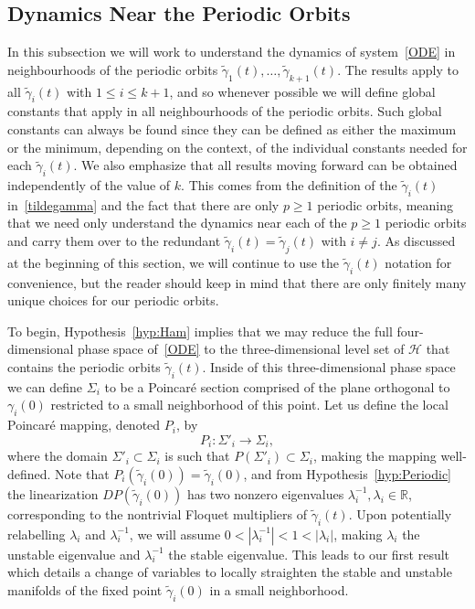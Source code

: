 \documentclass[11pt]{article}
\numberwithin{equation}{section}
\theoremstyle{plain}
\begin{document}
\subsection{Dynamics Near the Periodic Orbits}\label{subsec:Local}

In this subsection we will work to understand the dynamics of system~\eqref{ODE} in neighbourhoods of the periodic orbits $\tilde\gamma_1(t), \dots, \tilde\gamma_{k+1}(t)$. The results apply to all $\tilde\gamma_i(t)$ with $1 \leq i \leq k+1$, and so whenever possible we will define global constants that apply in all neighbourhoods of the periodic orbits. Such global constants can always be found since they can be defined as either the maximum or the minimum, depending on the context, of the individual constants needed for each $\tilde\gamma_i(t)$. We also emphasize that all results moving forward can be obtained independently of the value of $k$. This comes from the definition of the $\tilde\gamma_i(t)$ in~\eqref{tildegamma} and the fact that there are only $p \geq 1$ periodic orbits, meaning that we need only understand the dynamics near each of the $p\geq 1$ periodic orbits and carry them over to the redundant $\tilde\gamma_i(t) = \tilde\gamma_j(t)$ with $i \neq j$. As discussed at the beginning of this section, we will continue to use the $\tilde\gamma_i(t)$ notation for convenience, but the reader should keep in mind that there are only finitely many unique choices for our periodic orbits.  

To begin, Hypothesis~\ref{hyp:Ham} implies that we may reduce the full four-dimensional phase space of~\eqref{ODE} to the three-dimensional level set of $\mathcal{H}$ that contains the periodic orbits $\tilde\gamma_i(t)$. Inside of this three-dimensional phase space we can define $\Sigma_i$ to be a Poincar\'e section comprised of the plane orthogonal to $\gamma_i(0)$ restricted to a small neighborhood of this point. Let us define the local Poincar\'e mapping, denoted $P_i$, by 
\begin{equation}\label{Psec}
	P_i: \Sigma'_i \to \Sigma_i,
\end{equation} 
where the domain $\Sigma'_i \subset \Sigma_i$ is such that $P(\Sigma'_i) \subset \Sigma_i$, making the mapping well-defined. Note that $P_i(\tilde\gamma_i(0)) = \tilde\gamma_i(0)$, and from Hypothesis~\ref{hyp:Periodic} the linearization $DP(\tilde\gamma_i(0))$ has two nonzero eigenvalues $\lambda^{-1}_i,\lambda_i \in \mathbb{R}$, corresponding to the nontrivial Floquet multipliers of $\tilde\gamma_i(t)$. Upon potentially relabelling $\lambda_i$ and $\lambda_i^{-1}$, we will assume $0 < |\lambda_i^{-1}| < 1 < |\lambda_i|$, making $\lambda_i$ the unstable eigenvalue and $\lambda_i^{-1}$ the stable eigenvalue. This leads to our first result which details a change of variables to locally straighten the stable and unstable manifolds of the fixed point $\tilde\gamma_i(0)$ in a small neighborhood. 
\end{document}
